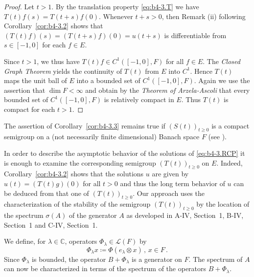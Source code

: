 \begin{proof} 
Let $t > 1$. 
By the translation property \eqref{eq:b4-3.T} we have $T(t)f(s) = T(t+s)f(0)$. Whenever $t + s > 0$, then Remark (ii) following Corollary~\ref{cor:b4-3.2} shows that $(T(t)f)(s) = (T(t+s)f)(0) = u(t+s)$ is differentiable from $s \in [-1,0]$ for each $f \in E$.

Since $t > 1$, we thus have $T(t)f \in C^1([-1,0],F)$ for all $f \in E$. 
The \emph{Closed Graph Theorem} yields the continuity of $T(t)$ from $E$ into $C^1$. 
Hence $T(t)$ maps the unit ball of $E$ into a bounded set of $C^1([-1,0],F)$. 
Again we use the assertion that $\dim F < \infty$ and obtain by the \emph{Theorem of Arzela-Ascoli} that every bounded set of $C^1([-1,0],F)$ is relatively compact in $E$. 
Thus $T(t)$ is compact for each $t > 1$.
\end{proof}
The assertion of Corollary~\ref{cor:b4-3.3} remains true if $(S(t))_{t \geq 0}$ is a compact semigroup on a (not necessarily finite dimensional) Banach space $F$ (see \citet{traviswebb:1974}).

In order to describe the asymptotic behavior of the solutions of \eqref{eq:b4-3.RCP} it is enough to examine the corresponding semigroup $(T(t))_{t \geq 0}$ on $E$. 
Indeed, Corollary~\ref{cor:b4-3.2} shows that the solutions $u$ are given by $u(t) = (T(t)g)(0)$ for all $t > 0$ and thus the long term behavior of $u$ can be deduced from that one of $(T(t))_{t \geq 0}$. 
Our approach uses the characterization of the stability of the semigroup $(T(t))_{t \geq 0}$ by the location of the spectrum $\sigma(A)$ of the generator $A$ as developed in A-IV, Section~1, B-IV, Section~1 and C-IV, Section~1.

We define, for $\lambda \in \mathbb{C}$, operators $\Phi_\lambda \in \mathcal{L}(F)$ by
\begin{equation}\label{eq:b4-3.3}
	\Phi_\lambda x  \coloneq  \Phi(e_\lambda \otimes x) \, , \, x \in F \, .
\end{equation}
Since $\Phi_\lambda$ is bounded, the operator $B + \Phi_\lambda$ is a generator on $F$. 
The spectrum of $A$ can now be characterized in terms of the spectrum of the operators $B + \Phi_\lambda$.


